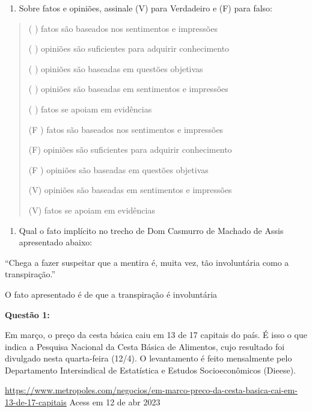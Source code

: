 {\begin{enumerate}
\def\labelenumi{\arabic{enumi})}
\setcounter{enumi}{8}
\tightlist
\item
  Sobre fatos e opiniões, assinale (V) para Verdadeiro e (F) para falso:
\end{enumerate}

\begin{quote}
( ) fatos são baseados nos sentimentos e impressões

( ) opiniões são suficientes para adquirir conhecimento

( ) opiniões são baseadas em questões objetivas

( ) opiniões são baseadas em sentimentos e impressões

( ) fatos se apoiam em evidências

(F ) fatos são baseados nos sentimentos e impressões

(F) opiniões são suficientes para adquirir conhecimento

(F ) opiniões são baseadas em questões objetivas

(V) opiniões são baseadas em sentimentos e impressões

(V) fatos se apoiam em evidências
\end{quote}

\begin{enumerate}
\def\labelenumi{\arabic{enumi})}
\setcounter{enumi}{9}
\tightlist
\item
  Qual o fato implícito no trecho de Dom Casmurro de Machado de Assis
  apresentado abaixo:
\end{enumerate}

``Chega a fazer suspeitar que a mentira é, muita vez, tão involuntária
como a transpiração.''

O fato apresentado é de que a transpiração é involuntária


\textbf{Questão 1:}

Em março, o preço da cesta básica caiu em 13 de 17 capitais do país. É
isso o que indica a Pesquisa Nacional da Cesta Básica de Alimentos, cujo
resultado foi divulgado nesta quarta-feira (12/4). O levantamento é
feito mensalmente pelo Departamento Intersindical de Estatística e
Estudos Socioeconômicos (Dieese).

\href{https://www.metropoles.com/negocios/em-marco-preco-da-cesta-basica-cai-em-13-de-17-capitais}{\uline{https://www.metropoles.com/negocios/em-marco-preco-da-cesta-basica-cai-em-13-de-17-capitais}}
Acess em 12 de abr 2023

}
